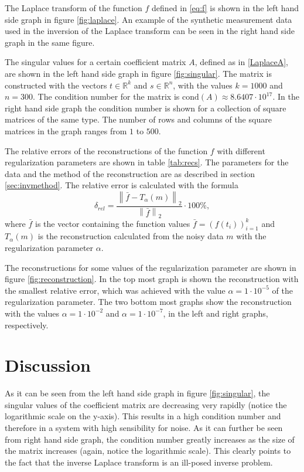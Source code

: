 \documentclass[12pt,a4]{article}
\newcommand{\R}{{\mathbb R}}
\newcommand{\cond}{\ensuremath{\text{cond}}}
\begin{document}
The Laplace transform of the function $f$ defined in \eqref{eq:f} is shown in the left hand side graph in figure \ref{fig:laplace}. An example of the synthetic measurement data used in the inversion of the Laplace transform can be seen in the right hand side graph in the same figure.

The singular values for a certain coefficient matrix $A$, defined as in \eqref{LaplaceA}, are shown in the left hand side graph in figure \ref{fig:singular}. The matrix is constructed with the vectors $t \in \R^k$ and $s \in \R^n$, with the values $k = 1000$ and $n = 300$. The condition number for the matrix is $\cond(A) \approx 8.6407 \cdot 10^{17}$. In the right hand side graph the condition number is shown for a collection of square matrices of the same type. The number of rows and columns of the square matrices in the graph ranges from $1$ to $500$.

The relative errors of the reconstructions of the function $f$ with different regularization parameters are shown in table \ref{tab:recs}. The parameters for the data and the method of the reconstruction are as described in section \ref{sec:invmethod}. The relative error is calculated with the formula
\begin{equation}
\delta_{rel} = \frac{\left\| \bar{f} - T_{\alpha}(m) \right\|_2}{\left\| \bar{f} \right\|_2} \cdot 100 \%,
\end{equation}
where $\bar{f}$ is the vector containing the function values $\bar{f} = \left( f(t_i) \right)_{i=1}^k$ and $T_{\alpha}(m)$ is the reconstruction calculated from the noisy data $m$ with the regularization parameter $\alpha$.

The reconstructions for some values of the regularization parameter are shown in figure \ref{fig:reconstruction}. In the top most graph is shown the reconstruction with the smallest relative error, which was achieved with the value $\alpha = 1 \cdot 10^{-5}$ of the regularization parameter. The two bottom most graphs show the reconstruction with the values $\alpha = 1 \cdot 10^{-2}$ and $\alpha = 1 \cdot 10^{-7}$, in the left and right graphs, respectively.


\section{Discussion}

As it can be seen from the left hand side graph in figure \ref{fig:singular}, the singular values of the coefficient matrix are decreasing very rapidly (notice the logarithmic scale on the y-axis). This results in a high condition number and therefore in a system with high sensibility for noise. As it can further be seen from right hand side graph, the condition number greatly increases as the size of the matrix increases (again, notice the logarithmic scale). This clearly points to the fact that the inverse Laplace transform is an ill-posed inverse problem.
\end{document}
